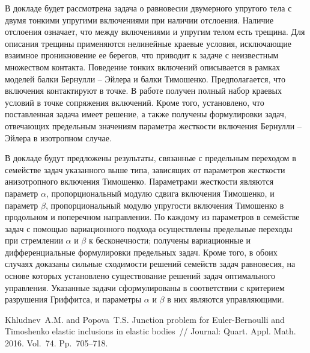 В докладе будет рассмотрена задача о равновесии двумерного упругого тела с двумя тонкими упругими включениями при наличии отслоения. Наличие отслоения означает, что между включениями и упругим телом есть трещина. Для описания трещины применяются нелинейные краевые условия, исключающие взаимное проникновение ее берегов, что приводит к задаче с неизвестным множеством контакта. Поведение тонких включений описывается в рамках моделей балки Бернулли -- Эйлера и балки Тимошенко. Предполагается, что включения контактируют в точке. В работе \cite{KhP2016} получен полный набор краевых условий в точке сопряжения включений. Кроме того, установлено, что поставленная задача имеет решение, а также получены формулировки задач, отвечающих предельным значениям параметра жесткости включения Бернулли -- Эйлера в изотропном случае.

В докладе будут предложены результаты, связанные с предельным переходом в семействе задач указанного выше типа, зависящих от параметров жесткости анизотропного включения Тимошенко. Параметрами жесткости являются параметр $\alpha$, пропорциональный модулю сдвига включения Тимошенко,  и параметр $\beta$, пропорциональный модулю упругости включения Тимошенко в продольном и поперечном направлении.
По каждому из параметров в семействе задач с помощью вариационного подхода осуществлены предельные переходы при стремлении $\alpha$ и $\beta$ к бесконечности; получены вариационные и дифференциальные формулировки предельных задач. Кроме того, в обоих случаях доказаны сильные сходимости решений семейств задач равновесия, на основе которых установлено существование решений задач оптимального управления. Указанные задачи сформулированы в соответствии с критерием разрушения Гриффитса, и параметры $\alpha$ и $\beta$ в них являются управляющими.






%



\begin{thebibliography}{9} %
 Khludnev~A.M. and Popova~T.S. Junction problem for Euler-Bernoulli and Timoshenko elastic inclusions in elastic bodies~// Journal: Quart. Appl. Math. 2016. Vol.~74. Pp.~705--718.
\end{thebibliography}





%

